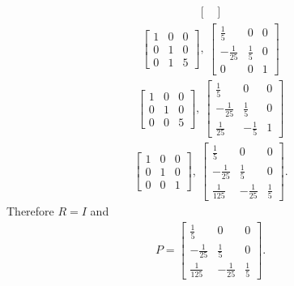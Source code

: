 \documentclass[12pt]{article}
\begin{document}
\begin{enumerate}
\begin{align*}
\begin{bmatrix}
      \end{bmatrix}
    \end{align*}
    \begin{align*}
      \begin{bmatrix}
        1 & 0 & 0\\
        0 & 1 & 0\\
        0 & 1 & 5
      \end{bmatrix},\
      \begin{bmatrix}
        \frac{1}{5} & 0 & 0\\
        -\frac{1}{25} & \frac{1}{5} & 0\\
        0 & 0 & 1
      \end{bmatrix}
    \end{align*}
    \begin{align*}
      \begin{bmatrix}
        1 & 0 & 0\\
        0 & 1 & 0\\
        0 & 0 & 5
      \end{bmatrix},\
      \begin{bmatrix}
        \frac{1}{5} & 0 & 0\\
        -\frac{1}{25} & \frac{1}{5} & 0\\
        \frac{1}{25} & -\frac{1}{5} & 1
      \end{bmatrix}
    \end{align*}
    \begin{align*}
      \begin{bmatrix}
        1 & 0 & 0\\
        0 & 1 & 0\\
        0 & 0 & 1
      \end{bmatrix},\
      \begin{bmatrix}
        \frac{1}{5} & 0 & 0\\
        -\frac{1}{25} & \frac{1}{5} & 0\\
        \frac{1}{125} & -\frac{1}{25} & \frac{1}{5}
      \end{bmatrix}.
    \end{align*}
    Therefore $R = I$ and
    \begin{align*}
      P =
      \begin{bmatrix}
        \frac{1}{5} & 0 & 0\\
        -\frac{1}{25} & \frac{1}{5} & 0\\
        \frac{1}{125} & -\frac{1}{25} & \frac{1}{5}
      \end{bmatrix}.

\end{align*}
\end{enumerate}
\end{document}
